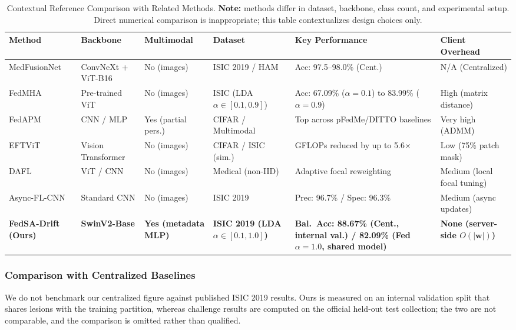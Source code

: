 \documentclass{ieeeaccess}
\newcommand{\sadrift}{FedSA-Drift}
\begin{document}
\begin{table}[t]
\centering
\caption{Contextual Reference Comparison with Related Methods. \textbf{Note:} methods differ in dataset, backbone, class count, and experimental setup. Direct numerical comparison is inappropriate; this table contextualizes design choices only.}
\label{tab:sota_comparison}
\begin{tabular}{p{2.8cm}p{2.4cm}p{2.2cm}p{2.0cm}p{3.2cm}p{2.8cm}}
\toprule
Method & Backbone & Multimodal & Dataset & Key Performance & Client Overhead \\
\midrule
MedFusionNet~\cite{Naeem2025} & ConvNeXt + ViT-B16 & No (images) & ISIC 2019 / HAM & Acc: 97.5--98.0\% (Cent.) & N/A (Centralized) \\
FedMHA~\cite{Darzi2024} & Pre-trained ViT & No (images) & ISIC (LDA $\alpha \in [0.1, 0.9]$) & Acc: 67.09\% ($\alpha{=}0.1$) to 83.99\% ($\alpha{=}0.9$) & High (matrix distance) \\
FedAPM~\cite{Zhu2025} & CNN / MLP & Yes (partial pers.) & CIFAR / Multimodal & Top across pFedMe/DITTO baselines & Very high (ADMM) \\
EFTViT~\cite{Wu2024} & Vision Transformer & No (images) & CIFAR / ISIC (sim.) & GFLOPs reduced by up to 5.6$\times$ & Low (75\% patch mask) \\
DAFL~\cite{Zhao2025} & ViT / CNN & No (images) & Medical (non-IID) & Adaptive focal reweighting & Medium (local focal tuning) \\
Async-FL-CNN~\cite{Yaqoob2023} & Standard CNN & No (images) & ISIC 2019 & Prec: 96.7\% / Spec: 96.3\% & Medium (async updates) \\
\midrule
\textbf{\sadrift{} (Ours)} & \textbf{SwinV2-Base} & \textbf{Yes (metadata MLP)} & \textbf{ISIC 2019 (LDA $\alpha \in [0.1, 1.0]$)} & \textbf{Bal.\ Acc: 88.67\% (Cent., internal val.) / 82.09\% (Fed $\alpha{=}1.0$, shared model)} & \textbf{None (server-side $O(|\mathbf{w}|)$)} \\
\bottomrule
\end{tabular}
\end{table}

\subsubsection{Comparison with Centralized Baselines}

We do not benchmark our centralized figure against published ISIC 2019 results. Ours is measured on an internal validation split that shares lesions with the training partition, whereas challenge results are computed on the official held-out test collection; the two are not comparable, and the comparison is omitted rather than qualified.
\end{document}
